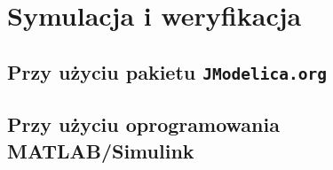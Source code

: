 \section{Symulacja i weryfikacja}
\label{sec:sym-wer}



\subsection{Przy użyciu pakietu \texttt{JModelica.org}}
\label{sub:sym-wer-jmodelica}


\subsection{Przy użyciu oprogramowania MATLAB/Simulink}
\label{sub:sym-wer-matlab}
